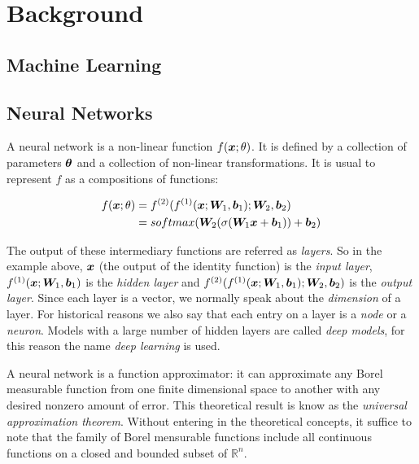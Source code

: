 \chapter{Background}
\label{ch:02-background}


\section{Machine Learning}


\section{Neural Networks}


A neural network is a non-linear function $f(\bm{x}; \theta)$. It is defined by a collection of parameters $\bm{\theta}$ and a collection of non-linear transformations. It is usual to represent $f$ as a compositions of functions:

\begin{align}
f(\bm{x}; \theta) &= f^{(2)}(f^{(1)}(\bm{x}; \bm{W}_1, \bm{b}_1); \bm{W}_2, \bm{b}_2)\\
&= softmax(\bm{W}_2 (\sigma(\bm{W}_1\bm{x} + \bm{b}_1)) + \bm{b}_2)
\end{align}


The output of these intermediary functions are referred as \textit{layers}. So in the example above, $\bm{x}$ (the output of the identity function) is the \textit{input layer}, $f^{(1)}(\bm{x}; \bm{W}_1, \bm{b}_1)$ is the \textit{hidden layer} and $f^{(2)}(f^{(1)}(\bm{x}; \bm{W}_1, \bm{b}_1); \bm{W}_2, \bm{b}_2)$ is the \textit{output layer}. Since each layer is a vector, we normally speak about the \textit{dimension} of a layer. For historical reasons we also say that each entry on a layer is a \textit{node} or a \textit{neuron}.  Models with a large number of hidden layers are called \textit{deep models}, for this reason the name \textit{deep learning} is used.  

\par A neural network is a function approximator: it can approximate any Borel measurable function from one finite dimensional space to another with any desired nonzero amount of error. This theoretical result is know as the \textit{universal approximation theorem}\cite{Cybenko}. Without entering in the theoretical concepts, it suffice to note that the family of Borel mensurable functions include all continuous functions on a closed and bounded subset of $\mathbb{R}^n$.



